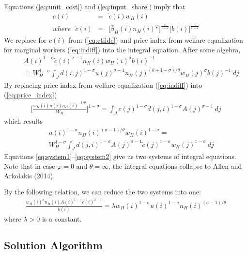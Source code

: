 \documentclass{article}
\begin{document}
Equations (\ref{eq:unit_cost}) and (\ref{eq:input_share}) imply that 
\begin{eqnarray}\label{eq:ctilde}
	c(i) & = & \tilde{c}(i) w_H(i) \nonumber \\
	where~~~ \tilde{c}(i) & = & 
	\Big[\bar{\beta}_H(i) n_H(i)^{\varphi}\Big] ^{\frac{\varepsilon}{1-\varepsilon}} \Big[b(i)\Big]^{\frac{-1}{1-\varepsilon}}
\end{eqnarray}
We replace for $c(i)$ from (\ref{eq:ctilde}) and price index from welfare equalization for marginal workers (\ref{eq:indiff}) into the integral equation. After some algebra,
\begin{eqnarray}\label{eq:system1}
	& & A(i)^{1-\sigma} \tilde{c}(i)^{\sigma-1} n_H(i)  w_H(i)^{\sigma}  b(i)^{-1}  \nonumber \\
	& & =  
	W_H^{1-\sigma}
	\int_J d(i,j)^{1-\sigma} u(j)^{\sigma-1} n_H(j)^{(\theta+1-\sigma)/\theta} w_H(j)^{\sigma} b(j)^{-1}  ~dj
\end{eqnarray}
By replacing price index from welfare equalization (\ref{eq:indiff}) into (\ref{eq:price_index}) 
\begin{eqnarray}
	\Big[ \frac{w_H(i) u(i) n_H(i)^{-1/\theta}}{W_H } \Big]^{1-\sigma} = \int_J c(j)^{1-\sigma}d(j,i)^{1-\sigma}A(j)^{\sigma-1}~ dj \nonumber
\end{eqnarray}
which results
\begin{eqnarray}\label{eq:system2}
 	& &  u(i)^{1-\sigma} n_H(i)^{(\sigma-1)/\theta} w_H(i)^{1-\sigma}  = \nonumber \\ 
 	& & 
 	W_H^{1-\sigma}
 	\int_J  d(j,i)^{1-\sigma} A(j)^{\sigma-1}  \tilde{c}(j)^{1-\sigma} w_H(j)^{1-\sigma}
 	~ dj
\end{eqnarray}
Equations \ref{eq:system1}--\ref{eq:system2} give us two systems of integral equations. Note that in case $\varphi=0$ and $\theta=\infty$, the integral equations collapse to Allen and Arkolakis (2014). 

By the following relation, we can reduce the two systems into one: 
\begin{eqnarray}\label{eq:systems_relation}
	\frac{w_H(i)^{\sigma}n_H(i)A(i)^{1-\sigma}\tilde{c}(i)^{\sigma-1}}{b(i)} = \lambda w_H(i)^{1-\sigma} u(i)^{1-\sigma} n_H(i)^{(\sigma-1)/\theta}
\end{eqnarray}
where $\lambda > 0$ is a constant.

\subsection{Solution Algorithm}
\end{document}
